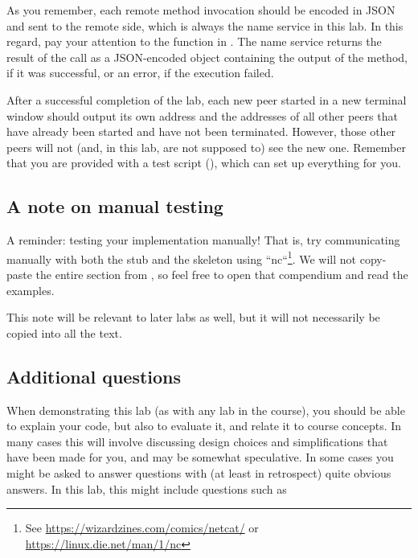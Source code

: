\documentclass[a4paper]{article}
\begin{document}
As you remember, each remote method invocation should be encoded in
JSON and sent to the remote side, which is always the name service in
this lab. In this regard, pay your attention to the 
function in . The name service returns the result of
the call as a JSON-encoded object containing the output of the method,
if it was successful, or an error, if the execution failed.


After a successful completion of the lab, each new peer started in a
new terminal window should output its own address and the addresses of
all other peers that have already been started and have not been
terminated. However, those other peers will not (and, in this lab, are
not supposed to) see the new one. Remember that you are provided with
a test script (), which can set up everything
for you.

\subsection{A note on manual testing}

A reminder: testing your implementation manually! That is, try
communicating manually with both the stub and the skeleton using
``nc``\footnote{See \url{https://wizardzines.com/comics/netcat/} or
\url{https://linux.die.net/man/1/nc}}. We will not copy-paste the
entire section from , so feel free to open that compendium and read the examples.

This note will be relevant to later labs as well, but it will not
necessarily be copied into all the text.

\subsection{Additional questions}
When demonstrating this lab (as with any lab in the course), you
should be able to explain your code, but also to evaluate it, and
relate it to course concepts. In many cases this will involve
discussing design choices and simplifications that have been made for
you, and may be somewhat speculative. In some cases you might be asked
to answer questions with (at least in retrospect) quite obvious
answers. In this lab, this might include questions such as
\end{document}
